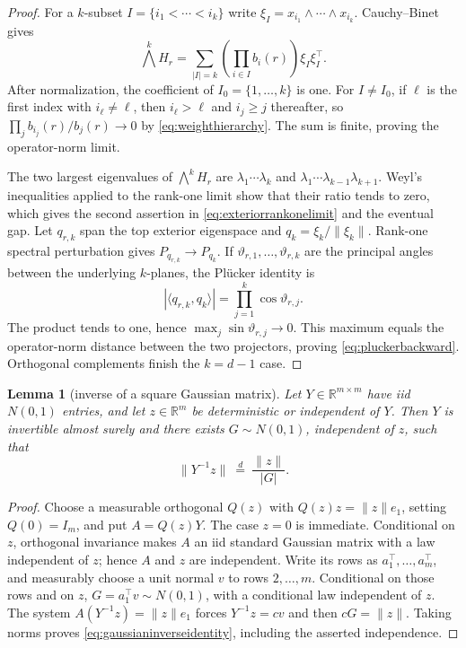 \documentclass[11pt]{article}
\newtheorem{lemma}[theorem]{Lemma}
\newcommand{\R}{\mathbb R}
\begin{document}
\begin{proof}
For a $k$-subset $I=\{i_1<\cdots<i_k\}$ write $\xi_I=x_{i_1}\wedge\cdots\wedge x_{i_k}$.  Cauchy--Binet gives
\[
 \bigwedge^kH_r=\sum_{|I|=k}\left(\prod_{i\in I}b_i(r)\right)\xi_I\xi_I^\top.
\]
After normalization, the coefficient of $I_0=\{1,\ldots,k\}$ is one.  For $I\ne I_0$, if $\ell$ is the first
index with $i_\ell\ne\ell$, then $i_\ell>\ell$ and $i_j\ge j$ thereafter, so
$\prod_jb_{i_j}(r)/b_j(r)\to0$ by \eqref{eq:weighthierarchy}.  The sum is finite, proving the operator-norm limit.

The two largest eigenvalues of $\bigwedge^kH_r$ are
$\lambda_1\cdots\lambda_k$ and $\lambda_1\cdots\lambda_{k-1}\lambda_{k+1}$.  Weyl's inequalities applied to
the rank-one limit show that their ratio tends to zero, which gives the second assertion in
\eqref{eq:exteriorrankonelimit} and the eventual gap.  Let $q_{r,k}$ span the top exterior eigenspace and
$q_k=\xi_k/\lVert\xi_k\rVert$.  Rank-one spectral perturbation gives
$P_{q_{r,k}}\to P_{q_k}$.  If $\vartheta_{r,1},\ldots,\vartheta_{r,k}$ are the principal angles between the
underlying $k$-planes, the Pl\"ucker identity is
\[
 |\langle q_{r,k},q_k\rangle|=\prod_{j=1}^k\cos\vartheta_{r,j}.
\]
The product tends to one, hence $\max_j\sin\vartheta_{r,j}\to0$.  This maximum equals the operator-norm
distance between the two projectors, proving \eqref{eq:pluckerbackward}.  Orthogonal complements finish the
$k=d-1$ case.
\end{proof}

\begin{lemma}[inverse of a square Gaussian matrix]
\label{lem:gaussianinverse}
Let $Y\in\R^{m\times m}$ have iid $N(0,1)$ entries, and let $z\in\R^m$ be deterministic or independent of $Y$.
Then $Y$ is invertible almost surely and there exists $G\sim N(0,1)$, independent of $z$, such that
\begin{equation}
 \lVert Y^{-1}z\rVert\ \stackrel d=\ \frac{\lVert z\rVert}{|G|}.
 \label{eq:gaussianinverseidentity}
\end{equation}
\end{lemma}

\begin{proof}
Choose a measurable orthogonal $Q(z)$ with $Q(z)z=\lVert z\rVert e_1$, setting $Q(0)=I_m$, and put
$A=Q(z)Y$.  The case $z=0$ is immediate.  Conditional on $z$, orthogonal invariance makes $A$ an iid
standard Gaussian matrix with a law independent of $z$; hence $A$ and $z$ are independent.  Write its rows as
$a_1^\top,\ldots,a_m^\top$, and measurably choose a unit normal $v$ to rows $2,\ldots,m$.  Conditional on those
rows and on $z$, $G=a_1^\top v\sim N(0,1)$, with a conditional law independent of $z$.  The system
$A(Y^{-1}z)=\lVert z\rVert e_1$ forces $Y^{-1}z=cv$ and then $cG=\lVert z\rVert$.  Taking norms proves
\eqref{eq:gaussianinverseidentity}, including the asserted independence.
\end{proof}
\end{document}
